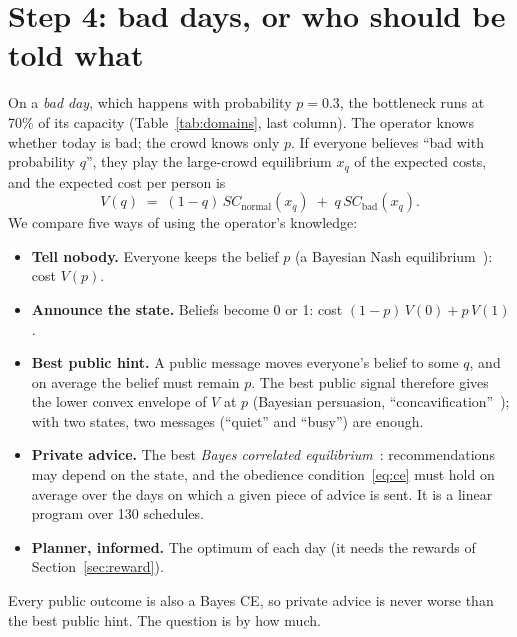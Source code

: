 \documentclass{article}
\begin{document}
\section{Step 4: bad days, or who should be told what}\label{sec:bad}
On a \emph{bad day}, which happens with probability $p=0.3$, the bottleneck runs at 70\% of its capacity
(Table~\ref{tab:domains}, last column). The operator knows whether today is bad; the crowd knows only $p$. If
everyone believes ``bad with probability $q$'', they play the large-crowd equilibrium $x_q$ of the expected costs,
and the expected cost per person is
\begin{equation}\label{eq:V}
V(q) \;=\; (1-q)\,SC_{\text{normal}}(x_q) \;+\; q\,SC_{\text{bad}}(x_q).
\end{equation}
We compare five ways of using the operator's knowledge:
\begin{itemize}
\item \textbf{Tell nobody.} Everyone keeps the belief $p$ (a Bayesian Nash equilibrium~\cite{harsanyi}): cost $V(p)$.
\item \textbf{Announce the state.} Beliefs become 0 or 1: cost $(1-p)\,V(0)+p\,V(1)$.
\item \textbf{Best public hint.} A public message moves everyone's belief to some $q$, and on average the belief must
remain $p$. The best public signal therefore gives the lower convex envelope of $V$ at $p$ (Bayesian persuasion,
``concavification''~\cite{kamenica}); with two states, two messages (``quiet'' and ``busy'') are enough.
\item \textbf{Private advice.} The best \emph{Bayes correlated equilibrium}~\cite{bergemann}: recommendations may
depend on the state, and the obedience condition~\eqref{eq:ce} must hold on average over the days on which a given
piece of advice is sent. It is a linear program over 130 schedules.
\item \textbf{Planner, informed.} The optimum of each day (it needs the rewards of Section~\ref{sec:reward}).
\end{itemize}
Every public outcome is also a Bayes CE, so private advice is never worse than the best public hint. The question is
by how much.
\end{document}
